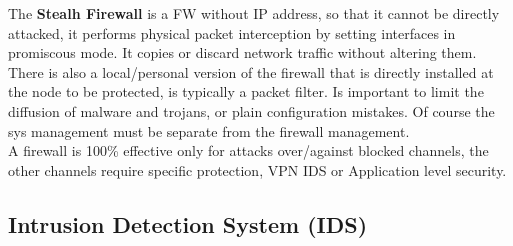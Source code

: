 \documentclass[12pt]{article}
\begin{document}
The \textbf{Stealh Firewall} is a FW without IP address, so that it cannot be directly attacked, it performs physical packet interception by setting interfaces in promiscous mode. It copies or discard network traffic without altering them.\\
There is also a local/personal version of the firewall that is directly installed at the node to be protected, is typically a packet filter. Is important to limit the diffusion of malware and trojans, or plain configuration mistakes. Of course the sys management must be separate from the firewall management.\\

A firewall is 100\% effective only for attacks over/against blocked channels, the other channels require specific protection, VPN IDS or Application level security.

\subsection{Intrusion Detection System (IDS)}
\end{document}
